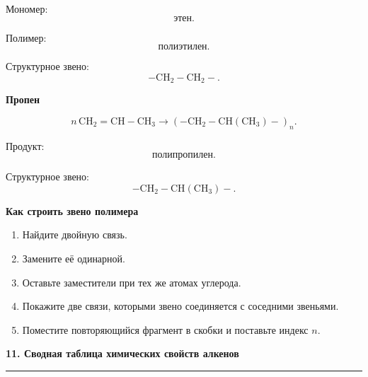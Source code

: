 \documentclass[a4paper,12pt]{article}
\newcommand{\topic}[1]{%
    \vspace{0.5em}
    {\Large\bfseries\textcolor{darkaccent}{#1}}\par
    \vspace{0.25em}
    {\color{accent}\rule{\linewidth}{0.7pt}}
    \vspace{0.4em}
}
\newcommand{\subtopic}[1]{%
    \vspace{0.35em}
    {\large\bfseries\textcolor{accent}{#1}}\par
}
\begin{document}
Мономер:
\[
\boxed{\text{этен}}.
\]

Полимер:
\[
\boxed{\text{полиэтилен}}.
\]

Структурное звено:
\[
\boxed{\mathrm{-CH_2-CH_2-}}.
\]

\subtopic{Пропен}

\[
n\,\mathrm{CH_2=CH-CH_3}
\longrightarrow
\left(
\mathrm{-CH_2-CH(CH_3)-}
\right)_n.
\]

Продукт:
\[
\boxed{\text{полипропилен}}.
\]

Структурное звено:
\[
\boxed{\mathrm{-CH_2-CH(CH_3)-}}.
\]

\subtopic{Как строить звено полимера}

\begin{enumerate}
    \item Найдите двойную связь.
    \item Замените её одинарной.
    \item Оставьте заместители при тех же атомах углерода.
    \item Покажите две связи, которыми звено соединяется с соседними звеньями.
    \item Поместите повторяющийся фрагмент в скобки и поставьте индекс \(n\).
\end{enumerate}


\topic{11. Сводная таблица химических свойств алкенов}
\end{document}
